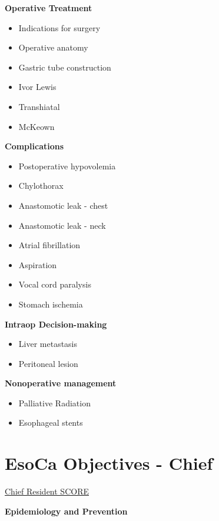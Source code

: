 \documentclass[
]{book}
\providecommand{\tightlist}{%
  \setlength{\itemsep}{0pt}\setlength{\parskip}{0pt}}
\begin{document}
\textbf{Operative Treatment}

\begin{itemize}
\tightlist
\item
  Indications for surgery
\item
  Operative anatomy
\item
  Gastric tube construction
\item
  Ivor Lewis
\item
  Transhiatal
\item
  McKeown
\end{itemize}

\textbf{Complications}

\begin{itemize}
\tightlist
\item
  Postoperative hypovolemia
\item
  Chylothorax
\item
  Anastomotic leak - chest
\item
  Anastomotic leak - neck
\item
  Atrial fibrillation
\item
  Aspiration
\item
  Vocal cord paralysis
\item
  Stomach ischemia
\end{itemize}

\textbf{Intraop Decision-making}

\begin{itemize}
\tightlist
\item
  Liver metastasis
\item
  Peritoneal lesion
\end{itemize}

\textbf{Nonoperative management}

\begin{itemize}
\tightlist
\item
  Palliative Radiation
\item
  Esophageal stents
\end{itemize}

\hypertarget{EsoObjCR}{%
\chapter{EsoCa Objectives - Chief}\label{EsoObjCR}}

\href{https://www.surgicalcore.org/modulecontent.aspx?id=1000690}{Chief Resident SCORE}

\textbf{Epidemiology and Prevention}
\end{document}
